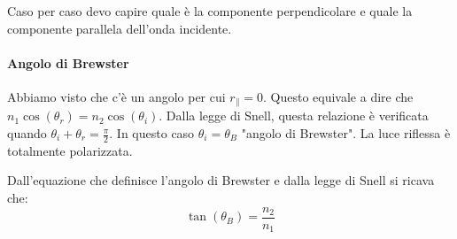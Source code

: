 Caso per caso devo capire quale è la componente perpendicolare e quale la componente parallela dell'onda incidente.

\paragraph{Angolo di Brewster}
Abbiamo visto che c'è un angolo per cui \(r_{\parallel } =0	\). Questo equivale a dire che \(n_1 \cos (\theta _r) = n_2 \cos (\theta _i)\). Dalla legge di Snell, questa relazione è verificata quando \(\theta _i + \theta _r = \frac{\pi}{2}\). In questo caso \(\theta _i = \theta _B\) "angolo di Brewster". La luce riflessa è totalmente polarizzata.
\begin{formula}
	Dall'equazione che definisce l'angolo di Brewster e dalla legge di Snell si ricava che:
	\begin{equation}
		\tan (\theta _B) = \frac{n_2}{n_1}
	\end{equation}
\end{formula}